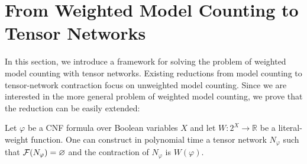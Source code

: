 \section{From Weighted Model Counting to Tensor Networks}
\label{sec:tensors:wmc}
In this section, we introduce a framework for solving the problem of weighted model counting with tensor networks. Existing reductions from model counting to tensor-network contraction \cite{BMT15,KCMR18} focus on unweighted model counting. Since we are interested in the more general problem of weighted model counting, we prove that the reduction can be easily extended:
\begin{theorem}
\label{thm:wmc-reduction}
Let $\varphi$ be a CNF formula over Boolean variables $X$ and let $W: 2^X \rightarrow \mathbb{R}$ be a literal-weight function. One can construct in polynomial time a tensor network $N_\varphi$ such that $\mathcal{F}(N_\varphi) = \varnothing$ and the contraction of $N_\varphi$ is $W(\varphi)$.
\end{theorem}
